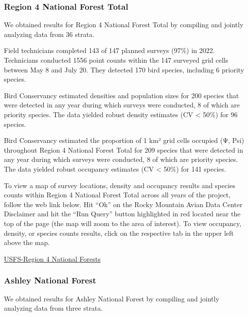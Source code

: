 \documentclass[
  letterpaper,
  DIV=11,
  numbers=noendperiod,
  oneside]{scrreprt}
\begin{document}
\hypertarget{region-4-national-forest-total}{%
\subsubsection{Region 4 National Forest
Total}\label{region-4-national-forest-total}}

We obtained results for Region 4 National Forest Total by compiling and
jointly analyzing data from 36 strata.

Field technicians completed 143 of 147 planned surveys (97\%) in 2022.
Technicians conducted 1556 point counts within the 147 surveyed grid
cells between May 8 and July 20. They detected 170 bird species,
including 6 priority species.

Bird Conservancy estimated densities and population sizes for 200
species that were detected in any year during which surveys were
conducted, 8 of which are priority species. The data yielded robust
density estimates (CV \textless{} 50\%) for 96 species.

Bird Conservancy estimated the proportion of 1 km² grid cells occupied
(Ψ, Psi) throughout Region 4 National Forest Total for 209 species that
were detected in any year during which surveys were conducted, 8 of
which are priority species. The data yielded robust occupancy estimates
(CV \textless{} 50\%) for 141 species.

To view a map of survey locations, density and occupancy results and
species counts within Region 4 National Forest Total across all years of
the project, follow the web link below. Hit ``Ok'' on the Rocky Mountain
Avian Data Center Disclaimer and hit the ``Run Query'' button
highlighted in red located near the top of the page (the map will zoom
to the area of interest). To view occupancy, density, or species counts
results, click on the respective tab in the upper left above the map.

\href{http://www.rmbo.org/new_site/adc/QueryWindow.aspx\#N4IgzgrgDgpgTmALnAhoiBbEAuABCAVQGUAxIgWgCUYBzASwHsA7XAFlwDk1GmUAbXCQZwYSMCAC+QA=}{USFS-Region
4 National Forests}

\hypertarget{ashley-national-forest}{%
\subsubsection{Ashley National Forest}\label{ashley-national-forest}}

We obtained results for Ashley National Forest by compiling and jointly
analyzing data from three strata.
\end{document}
